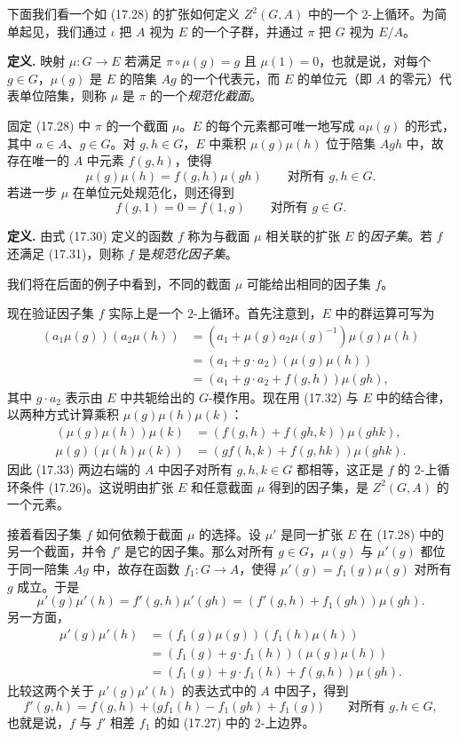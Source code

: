 下面我们看一个如 (17.28) 的扩张如何定义 $Z^2(G,A)$ 中的一个 $2$-上循环。为简单起见，我们通过 $\iota$ 把 $A$ 视为 $E$ 的一个子群，并通过 $\pi$ 把 $G$ 视为 $E/A$。

\noindent\textbf{定义.} 映射 $\mu:G\to E$ 若满足 $\pi\circ\mu(g)=g$ 且 $\mu(1)=0$，也就是说，对每个 $g\in G$，$\mu(g)$ 是 $E$ 的陪集 $Ag$ 的一个代表元，而 $E$ 的单位元（即 $A$ 的零元）代表单位陪集，则称 $\mu$ 是 $\pi$ 的一个\emph{规范化截面}。

固定 (17.28) 中 $\pi$ 的一个截面 $\mu$。$E$ 的每个元素都可唯一地写成 $a\mu(g)$ 的形式，其中 $a\in A$、$g\in G$。对 $g,h\in G$，$E$ 中乘积 $\mu(g)\mu(h)$ 位于陪集 $Agh$ 中，故存在唯一的 $A$ 中元素 $f(g,h)$，使得
\[
  \mu(g)\mu(h)=f(g,h)\mu(gh)
  \qquad\text{对所有 }g,h\in G.
  \tag{17.30}
\]
若进一步 $\mu$ 在单位元处规范化，则还得到
\[
  f(g,1)=0=f(1,g)
  \qquad\text{对所有 }g\in G.
  \tag{17.31}
\]

\noindent\textbf{定义.} 由式 (17.30) 定义的函数 $f$ 称为与截面 $\mu$ 相关联的扩张 $E$ 的\emph{因子集}。若 $f$ 还满足 (17.31)，则称 $f$ 是\emph{规范化因子集}。

我们将在后面的例子中看到，不同的截面 $\mu$ 可能给出相同的因子集 $f$。

现在验证因子集 $f$ 实际上是一个 $2$-上循环。首先注意到，$E$ 中的群运算可写为
\[
\begin{aligned}
  (a_1\mu(g))(a_2\mu(h))
  &=(a_1+\mu(g)a_2\mu(g)^{-1})\mu(g)\mu(h)\\
  &=(a_1+g\cdot a_2)(\mu(g)\mu(h))\\
  &=(a_1+g\cdot a_2+f(g,h))\mu(gh),
\end{aligned}
\tag{17.32}
\]
其中 $g\cdot a_2$ 表示由 $E$ 中共轭给出的 $G$-模作用。现在用 (17.32) 与 $E$ 中的结合律，以两种方式计算乘积 $\mu(g)\mu(h)\mu(k)$：
\[
\begin{aligned}
  (\mu(g)\mu(h))\mu(k)&=(f(g,h)+f(gh,k))\mu(ghk),\\
  \mu(g)(\mu(h)\mu(k))&=(g f(h,k)+f(g,hk))\mu(ghk).
\end{aligned}
\tag{17.33}
\]
因此 (17.33) 两边右端的 $A$ 中因子对所有 $g,h,k\in G$ 都相等，这正是 $f$ 的 $2$-上循环条件 (17.26)。这说明由扩张 $E$ 和任意截面 $\mu$ 得到的因子集，是 $Z^2(G,A)$ 的一个元素。

接着看因子集 $f$ 如何依赖于截面 $\mu$ 的选择。设 $\mu'$ 是同一扩张 $E$ 在 (17.28) 中的另一个截面，并令 $f'$ 是它的因子集。那么对所有 $g\in G$，$\mu(g)$ 与 $\mu'(g)$ 都位于同一陪集 $Ag$ 中，故存在函数 $f_1:G\to A$，使得 $\mu'(g)=f_1(g)\mu(g)$ 对所有 $g$ 成立。于是
\[
  \mu'(g)\mu'(h)=f'(g,h)\mu'(gh)=(f'(g,h)+f_1(gh))\mu(gh).
\]
另一方面，
\[
\begin{aligned}
  \mu'(g)\mu'(h)
  &=(f_1(g)\mu(g))(f_1(h)\mu(h))\\
  &=(f_1(g)+g\cdot f_1(h))(\mu(g)\mu(h))\\
  &=(f_1(g)+g\cdot f_1(h)+f(g,h))\mu(gh).
\end{aligned}
\]
比较这两个关于 $\mu'(g)\mu'(h)$ 的表达式中的 $A$ 中因子，得到
\[
  f'(g,h)=f(g,h)+\bigl(gf_1(h)-f_1(gh)+f_1(g)\bigr)
  \qquad\text{对所有 }g,h\in G,
\]
也就是说，$f$ 与 $f'$ 相差 $f_1$ 的如 (17.27) 中的 $2$-上边界。

